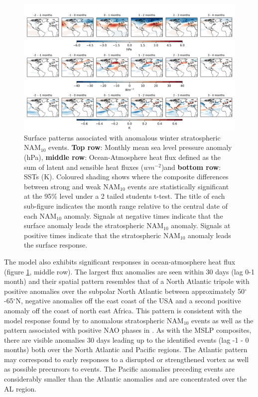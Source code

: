 \begin{center}
\begin{figure}[h!]
\noindent\includegraphics[width = \linewidth]{Figures/Figures-surface/in_season_response_NAM_combined.png}
\caption[Surface patterns associated with anomalous winter stratospheric NAM$_{10}$ events.]{Surface patterns associated with anomalous winter stratospheric NAM$_{10}$ events. \textbf{Top row}: Monthly mean sea level pressure anomaly (hPa), \textbf{middle row}: Ocean-Atmosphere heat flux defined as the sum of latent and sensible heat fluxes ($wm^{-2}$)and \textbf{bottom row}: SSTs (K). Coloured shading shows where the composite differences between strong and weak NAM$_{10}$ events are statistically significant at the 95\% level under a 2 tailed students t-test. The title of each sub-figure indicates the month range relative to the central date of each NAM$_{10}$ anomaly. Signals at negative times indicate that the surface anomaly leads the stratospheric NAM$_{10}$ anomaly. Signals at positive  times indicate that the stratospheric NAM$_{10}$ anomaly leads the surface response.}
\label{fig:surface_comp_all}
\end{figure}
\end{center}

The model also exhibits significant responses in ocean-atmosphere heat flux (figure \ref{fig:surface_comp_all}, middle row). The largest flux anomalies are seen within 30 days (lag 0-1 month) and their spatial pattern resembles that of a North Atlantic tripole with positive anomalies over the subpolar North Atlantic between approximately 50$^\circ$-65$^\circ$N, negative anomalies off the east coast of the USA and a second positive anomaly off the coast of north east Africa. This pattern is consistent with the model response found by \cite{reichlerStratospheric2012b} to anomalous stratospheric NAM$_{10}$ events as well as the pattern associated with positive NAO phases in \cite{delworthImpact2016c}. As with the MSLP composites, there are visible anomalies 30 days leading up to the identified events (lag -1 - 0 months) both over the North Atlantic and Pacific regions. The Atlantic pattern may correspond to early responses to a disrupted or strengthened vortex as well as possible precursors to events. The Pacific anomalies preceding events are considerably smaller than the Atlantic anomalies and are concentrated over the AL region.

